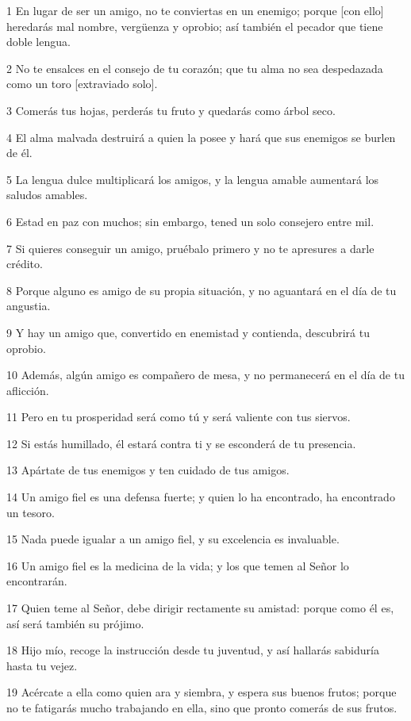 \par 1 En lugar de ser un amigo, no te conviertas en un enemigo; porque [con ello] heredarás mal nombre, vergüenza y oprobio; así también el pecador que tiene doble lengua.
\par 2 No te ensalces en el consejo de tu corazón; que tu alma no sea despedazada como un toro [extraviado solo].
\par 3 Comerás tus hojas, perderás tu fruto y quedarás como árbol seco.
\par 4 El alma malvada destruirá a quien la posee y hará que sus enemigos se burlen de él.
\par 5 La lengua dulce multiplicará los amigos, y la lengua amable aumentará los saludos amables.
\par 6 Estad en paz con muchos; sin embargo, tened un solo consejero entre mil.
\par 7 Si quieres conseguir un amigo, pruébalo primero y no te apresures a darle crédito.
\par 8 Porque alguno es amigo de su propia situación, y no aguantará en el día de tu angustia.
\par 9 Y hay un amigo que, convertido en enemistad y contienda, descubrirá tu oprobio.
\par 10 Además, algún amigo es compañero de mesa, y no permanecerá en el día de tu aflicción.
\par 11 Pero en tu prosperidad será como tú y será valiente con tus siervos.
\par 12 Si estás humillado, él estará contra ti y se esconderá de tu presencia.
\par 13 Apártate de tus enemigos y ten cuidado de tus amigos.
\par 14 Un amigo fiel es una defensa fuerte; y quien lo ha encontrado, ha encontrado un tesoro.
\par 15 Nada puede igualar a un amigo fiel, y su excelencia es invaluable.
\par 16 Un amigo fiel es la medicina de la vida; y los que temen al Señor lo encontrarán.
\par 17 Quien teme al Señor, debe dirigir rectamente su amistad: porque como él es, así será también su prójimo.
\par 18 Hijo mío, recoge la instrucción desde tu juventud, y así hallarás sabiduría hasta tu vejez.
\par 19 Acércate a ella como quien ara y siembra, y espera sus buenos frutos; porque no te fatigarás mucho trabajando en ella, sino que pronto comerás de sus frutos.
